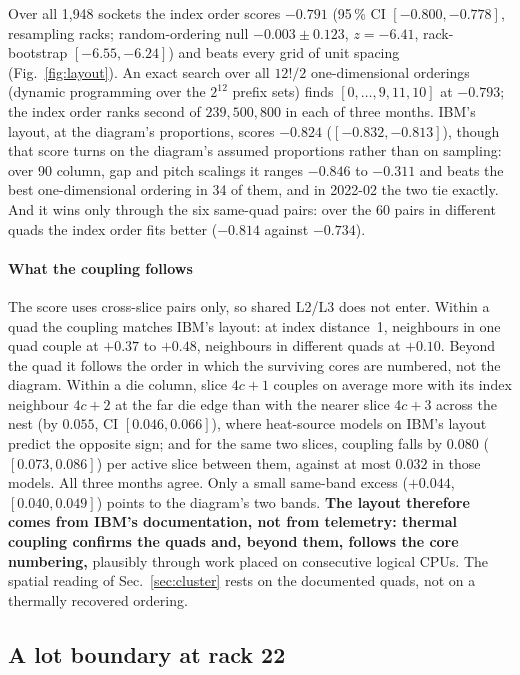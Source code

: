 \documentclass[10pt,conference]{IEEEtran}
\begin{document}
Over all 1{,}948 sockets the index order scores $-0.791$ (95\,\% CI $[-0.800,-0.778]$, resampling
racks; random-ordering null $-0.003\pm0.123$, $z=-6.41$, rack-bootstrap $[-6.55,-6.24]$) and beats every
grid of unit spacing
(Fig.~\ref{fig:layout}). An exact search over all $12!/2$ one-dimensional orderings (dynamic
programming over the $2^{12}$ prefix sets) finds $[0,\dots,9,11,10]$ at $-0.793$; the index order
ranks second of $239{,}500{,}800$ in each of three months. IBM's layout, at the diagram's
proportions, scores $-0.824$ ($[-0.832,-0.813]$), though that score turns on the diagram's assumed
proportions rather than on sampling: over 90 column, gap and pitch scalings it ranges $-0.846$ to
$-0.311$ and beats the best one-dimensional ordering in 34 of them, and in 2022-02 the two tie
exactly. And it wins only through the six same-quad pairs: over the 60 pairs in different quads the
index order fits better ($-0.814$ against $-0.734$).

\paragraph*{What the coupling follows} The score uses cross-slice pairs only, so shared L2/L3 does
not enter. Within a quad the coupling matches IBM's layout: at index distance~1, neighbours in one
quad couple at $+0.37$ to $+0.48$, neighbours in different quads at $+0.10$. Beyond the quad it
follows the order in which the surviving cores are numbered, not the diagram. Within a die column,
slice $4c{+}1$ couples on average more with its index neighbour $4c{+}2$ at the far die edge than
with the nearer slice $4c{+}3$ across the nest (by $0.055$, CI $[0.046,0.066]$), where heat-source
models on IBM's layout predict the opposite sign; and for the same two slices, coupling falls by
$0.080$ ($[0.073,0.086]$) per active slice between them, against at most $0.032$ in those models.
All three months agree. Only a small same-band excess ($+0.044$, $[0.040,0.049]$) points to the
diagram's two bands. \textbf{The layout therefore comes from IBM's documentation, not from
telemetry: thermal coupling confirms the quads and, beyond them, follows the core numbering,}
plausibly through work placed on consecutive logical CPUs. The spatial reading of
Sec.~\ref{sec:cluster} rests on the documented quads, not on a thermally recovered ordering.


\subsection{A lot boundary at rack 22}
\label{sec:lot}
\end{document}
